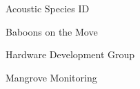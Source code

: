 \item Acoustic Species ID
\item Baboons on the Move
\item Hardware Development Group
\item Mangrove Monitoring
